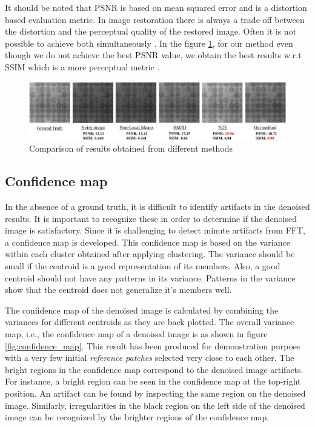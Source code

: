 \documentclass[fleqn,10pt]{wlscirep}
\begin{document}
	It should be noted that PSNR is based on mean squared error and is a distortion based evaluation metric. In image restoration there is always a trade-off between the distortion and the perceptual quality of the restored image. Often it is not possible to achieve both simultaneously \cite{8578750}. In the figure \ref{fig:comparison_sample}, for our method even though we do not achieve the best PSNR value, we obtain the best results w.r.t SSIM which is a more perceptual metric \cite{8578750}.
	
	\begin{figure}
		\centering
		\includegraphics[scale=0.375]{./imgs/comparison_sample.jpg}
		\caption{Comparison of results obtained from different methods}
		\label{fig:comparison_sample}
	\end{figure}
	
	
	\subsection*{Confidence map}
	
	In the absence of a ground truth, it is difficult to identify artifacts in the denoised results. It is important to recognize these in order to determine if the denoised image is satisfactory. Since it is challenging to detect minute artifacts from FFT, a confidence map is developed. This confidence map is based on the variance within each cluster obtained after applying clustering. The variance should be small if the centroid is a good representation of its members. Also, a good centroid should not have any patterns in its variance. Patterns in the variance show that the centroid does not generalize it's members well. 
	
	The confidence map of the denoised image is calculated by combining the variances\cite{chan1982updating} for different centroids as they are back plotted. The overall variance map, i.e., the confidence map of a denoised image is as shown in figure \ref{fig:confidence_map}. This result has been produced for demonstration purpose with a very few initial \textit{reference patches} selected very close to each other. The bright regions in the confidence map correspond to the denoised image artifacts. For instance, a bright region can be seen in the confidence map at the top-right position. An artifact can be found by inspecting the same region on the denoised image. Similarly, irregularities in the black region on the left side of the denoised image can be recognized by the brighter regions of the confidence map.
	
\end{document}
